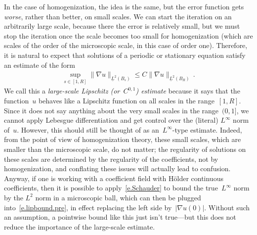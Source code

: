 \documentclass[11pt]{article} %
\numberwithin{equation}{section}
\theoremstyle{definition}
\begin{document}
\smallskip

In the case of homogenization, the idea is the same, but the error function gets \emph{worse}, rather than better, on small scales. We can start the iteration on an arbitrarily large scale, because there the error is relatively small, but we must stop the iteration once the scale becomes too small for homogenization (which are scales of the order of the microscopic scale, in this case of order one). Therefore, it is natural to expect that solutions of a periodic or stationary equation satisfy an estimate of the form 
\begin{align}
\label{e.lipbound.pre}
\sup_{s \in [1,R]}
\| \nabla u \|_{\underline{L}^2(B_s)}
\leq 
C \| \nabla u \|_{\underline{L}^2(B_R)} \,.
\end{align}
We call this a \emph{large-scale Lipschitz (or~$C^{0,1}$) estimate} because it says that the function~$u$ behaves like a Lipschitz function on all scales in the range~$[1,R]$. Since it does not say anything about the very small scales in the range~$(0,1]$, we cannot apply Lebesgue differentiation and get control over the (literal) $L^\infty$ norm of~$u$. However, this should still be thought of as an~$L^\infty$-type estimate. Indeed, from the point of view of homogenization theory, these small scales, which are smaller than the microscopic scale, do not matter; the regularity of solutions on these scales are determined by the regularity of the coefficients, not by homogenization, and conflating these issues will actually lead to confusion. 
Anyway, if one is working with a coefficient field with H\"older continuous coefficients, then it is possible to apply~\eqref{e.Schauder} to bound the true~$L^\infty$ norm by the $L^2$ norm in a microscopic ball, which can then be plugged into~\eqref{e.lipbound.pre}, in effect replacing the left side by~$|\nabla u(0)|$. Without such an assumption, a pointwise bound like this just isn't true---but this does not reduce the importance of the large-scale estimate. 

\smallskip
\end{document}
